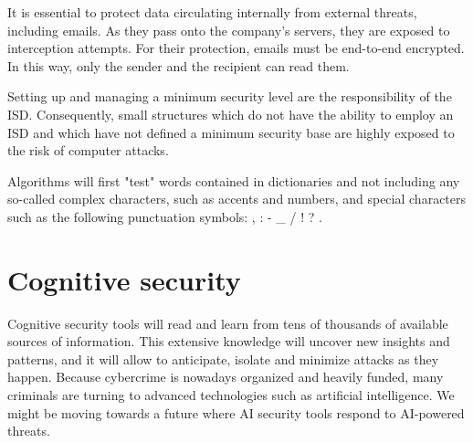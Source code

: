 \begin{itemize}
It is essential to protect data circulating internally from external threats, including emails. As they pass onto the company’s servers, they are exposed to interception attempts. For their protection, emails must be end-to-end encrypted. In this way, only the sender and the recipient can read them.

Setting up and managing a minimum security level are the responsibility of the ISD. Consequently, small structures which do not have the ability to employ an ISD and which have not defined a minimum security base are highly exposed to the risk of computer attacks.

Algorithms will first "test" words contained in dictionaries and not including any so-called complex characters, such as accents and numbers, and special characters such as the following punctuation symbols: , : - _ / ! ? .

\section{Cognitive security}

Cognitive security tools will read and learn from tens of thousands of available sources of information. This extensive knowledge will uncover new insights and patterns, and it will allow to anticipate, isolate and minimize attacks as they happen.
Because cybercrime is nowadays organized and heavily funded, many criminals are turning to advanced technologies such as artificial intelligence. We might be moving towards a future where AI security tools respond to AI-powered threats.
\blindtext







\blindtext


\end{itemize}


